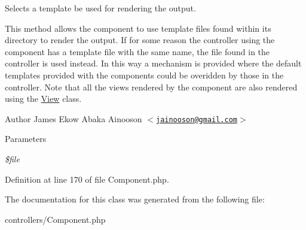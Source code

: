 Selects a template be used for rendering the output. 

This method allows the component to use template files found within its directory to render the output. If for some reason the controller using the component has a template file with the same name, the file found in the controller is used instead. In this way a mechanism is provided where the default templates provided with the components could be overidden by those in the controller. Note that all the views rendered by the component are also rendered using the \hyperlink{class_view}{View} class.

\begin{DoxyAuthor}{Author}
James Ekow Abaka Ainooson $<$\href{mailto:jainooson@gmail.com}{\tt jainooson@gmail.com}$>$ 
\end{DoxyAuthor}

\begin{DoxyParams}{Parameters}
\item[{\em \$file}]\end{DoxyParams}


Definition at line 170 of file Component.php.



The documentation for this class was generated from the following file:\begin{DoxyCompactItemize}
\item 
controllers/Component.php\end{DoxyCompactItemize}
